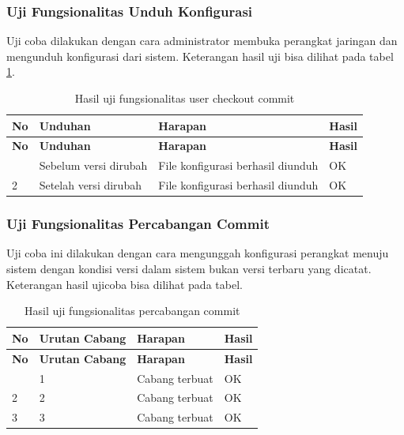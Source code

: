 	\subsubsection{Uji Fungsionalitas Unduh Konfigurasi}
	Uji coba dilakukan dengan cara administrator membuka perangkat jaringan dan mengunduh konfigurasi dari sistem. Keterangan hasil uji bisa dilihat pada tabel \ref{hasilUnduhKonfig}.\\
	\begin{longtable}{|p{}|p{}|p{}|p{}|}
		
		\caption{Hasil uji fungsionalitas user checkout commit} \label{hasilUnduhKonfig} \\
		\hline
		\textbf{No} & \textbf{Unduhan} & \textbf{Harapan} & \textbf{Hasil} \\ \hline
		\endfirsthead
		\hline
		\textbf{No} & \textbf{Unduhan} & \textbf{Harapan} & \textbf{Hasil} \\ \hline
		\endhead
		\endfoot
		\endlastfoot
		1 & Sebelum versi dirubah & File konfigurasi berhasil diunduh & OK\\ \hline
		2 & Setelah versi dirubah & File konfigurasi berhasil diunduh & OK\\ \hline
		
	\end{longtable}
	
	
	\subsubsection{Uji Fungsionalitas Percabangan Commit}
	Uji coba ini dilakukan dengan cara mengunggah konfigurasi perangkat menuju sistem dengan kondisi versi dalam sistem bukan versi terbaru yang dicatat. Keterangan hasil ujicoba bisa dilihat pada tabel.
	
	\begin{longtable}{|p{}|p{}|p{}|p{}|}
		
		\caption{Hasil uji fungsionalitas percabangan commit} \label{hasil precabangan commit} \\
		\hline
		\textbf{No} & \textbf{Urutan Cabang} & \textbf{Harapan} & \textbf{Hasil} \\ \hline
		\endfirsthead
		\hline
		\textbf{No} & \textbf{Urutan Cabang} & \textbf{Harapan} & \textbf{Hasil} \\ \hline
		\endhead
		\endfoot
		\endlastfoot
		1 & 1 & Cabang terbuat & OK\\ \hline
		2 & 2 & Cabang terbuat & OK\\ \hline
		3 & 3 & Cabang terbuat & OK\\ \hline
	\end{longtable}
	
